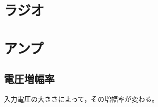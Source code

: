 \documentclass[report.tex]{subfiles}
\begin{document}
\section{ラジオ}

\section{アンプ}
\subsection{電圧増幅率}
入力電圧の大きさによって，その増幅率が変わる。%

\end{document}
